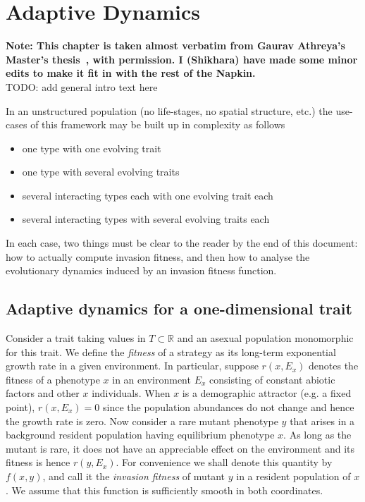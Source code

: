 

\chapter{Adaptive Dynamics}

\textbf{Note: This chapter is taken almost verbatim from Gaurav Athreya's Master's thesis~\citep{athreya_thesis_2023}, with permission. I (Shikhara) have made some minor edits to make it fit in with the rest of the Napkin.}
\\

{\color{red}TODO: add general intro text here}

In an unstructured population (no life-stages, no spatial structure, etc.) the use-cases of this framework may be built up in complexity as follows
\begin{itemize} \itemsep -1mm
	\item one type with one evolving trait
	\item one type with several evolving traits
	\item several interacting types each with one evolving trait each
	\item several interacting types with several evolving traits each
\end{itemize}  

In each case, two things must be clear to the reader by the end of this document: how to actually compute invasion fitness, and then how to analyse the evolutionary dynamics induced by an invasion fitness function. 

\section{Adaptive dynamics for a one-dimensional trait}
\label{section:1-dim-AD}

Consider a trait taking values in $T \subset \mathbb{R}$ and an asexual population monomorphic for this trait. We define the \emph{fitness} of a strategy as its long-term exponential growth rate in a given environment. 
In particular, suppose $r(x, E_x)$ denotes the fitness of a phenotype $x$ in an environment $E_x$ consisting of constant abiotic factors and other $x$ individuals.
When $x$ is a demographic attractor (e.g. a fixed point), $r(x, E_x) = 0$ since the population abundances do not change and hence the growth rate is zero. 
Now consider a rare mutant phenotype $y$ that arises in a background resident population having equilibrium phenotype $x$.  
As long as the mutant is rare, it does not have an appreciable effect on the environment and its fitness is hence $r(y, E_x)$. 
For convenience we shall denote this quantity by $f(x,y)$, and call it the \textit{invasion fitness} of mutant $y$ in a resident population of $x$. 
We assume that this function is sufficiently smooth in both coordinates. 

